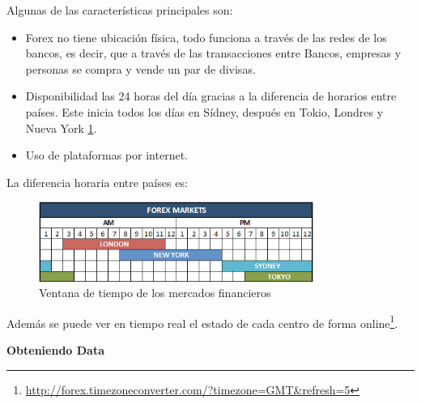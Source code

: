 Algunas de las características principales son:
\begin{itemize}
 \item Forex no tiene ubicación física, todo funciona a través de las redes de
 los bancos, es decir, que a través de las transacciones entre Bancos, empresas
 y personas se compra y vende un par de divisas.
 \item Disponibilidad las 24 horas del día gracias a la diferencia de horarios
 entre países. Este inicia todos los días en Sídney, después en Tokio, Londres
 y Nueva York \ref{fig:forex_markets_hours}.
 \item Uso de plataformas por internet.
\end{itemize}

La diferencia horaria entre países es:
\begin{figure}[h!t]
    \begin{center}
        \includegraphics[width=0.8\textwidth]{images/ventana}
        \caption{Ventana de tiempo de los mercados financieros}
        \label{fig:forex_markets_hours}
    \end{center}
\end{figure}

\noindent Además se puede ver en tiempo real el estado de cada centro de forma
online\footnote{\url{http://forex.timezoneconverter.com/?timezone=GMT&refresh=5}}.

\vspace{1cm}
\noindent\textbf{Obteniendo Data}\\

